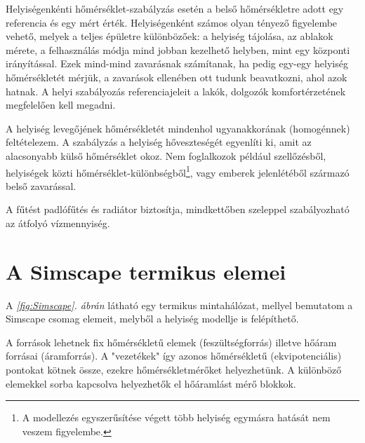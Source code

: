 



%
%
%
%


Helyiségenkénti hőmérséklet-szabályzás esetén a belső hőmérsékletre adott egy referencia és egy mért érték.
Helyiségenként számos olyan tényező figyelembe vehető, melyek a teljes épületre különbözőek: a helyiség tájolása, az ablakok mérete, a felhasználás módja mind jobban kezelhető helyben, mint egy központi irányítással. Ezek mind-mind zavarásnak számítanak, ha pedig egy-egy helyiség hőmérsékletét mérjük, a zavarások ellenében ott tudunk beavatkozni, ahol azok hatnak. A helyi szabályozás referenciajeleit a lakók, dolgozók komfortérzetének megfelelően kell megadni.

A helyiség levegőjének hőmérsékletét mindenhol ugyanakkorának (homogénnek) feltételezem. A szabályzás a helyiség hőveszteségét egyenlíti ki, amit az alacsonyabb külső hőmérséklet okoz. Nem foglalkozok például szellőzésből, helyiségek közti hőmérséklet-különbségből\footnote{A modellezés egyszerűsítése végett több helyiség egymásra hatását nem veszem figyelembe.}, vagy emberek jelenlétéből származó belső zavarással.

A fűtést padlófűtés és radiátor biztosítja, mindkettőben szeleppel szabályozható az átfolyó vízmennyiség.

\section{A Simscape termikus elemei}

A \textit{\ref{fig:Simscape}. ábrán} látható egy termikus mintahálózat, mellyel bemutatom a Simscape csomag elemeit, melyből a helyiség modellje is felépíthető.

A források lehetnek fix hőmérsékletű elemek (feszültségforrás) illetve hőáram forrásai (áramforrás).
A "vezetékek" így azonos hőmérsékletű (ekvipotenciális) pontokat kötnek össze, ezekre hőmérsékletmérőket helyezhetünk. A különböző elemekkel sorba kapcsolva helyezhetők el hőáramlást mérő blokkok.

